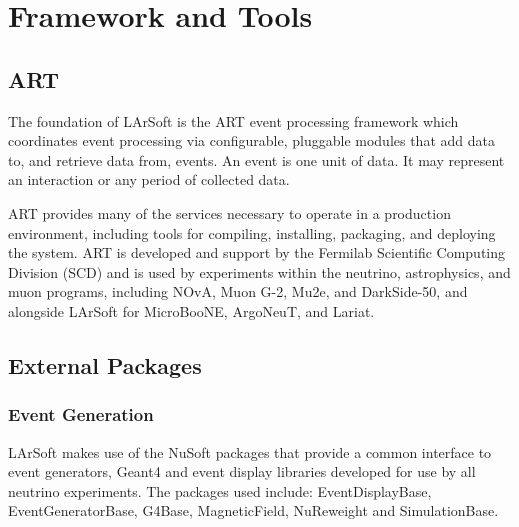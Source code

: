 \documentclass[12pt]{elsarticle}
\begin{document}
\hspace*{2cm}
\begin{figure}[h]
\centering
\label{bubble}
\end{figure}

\section{Framework and Tools}
\subsection{ART}
The foundation of LArSoft is the ART event processing framework which coordinates event processing via configurable, pluggable modules that add data to, and retrieve data from, events.\cite{art-ref}  An event is one unit of data. It may represent an interaction or any period of collected data.

ART provides many of the services necessary to operate in a production environment, including tools for compiling, installing, packaging, and deploying the system.  ART is developed and support by the Fermilab Scientific Computing Division (SCD) and is used by experiments within the neutrino, astrophysics, and muon programs, including NOvA, Muon G-2, Mu2e, and DarkSide-50, and alongside LArSoft for MicroBooNE, ArgoNeuT, and Lariat.

\subsection{External Packages}
\subsubsection{Event Generation}
LArSoft makes use of the NuSoft packages that provide a common interface to event generators, Geant4 and event display libraries developed for use by all neutrino experiments. The packages used include:    EventDisplayBase, EventGeneratorBase, G4Base, MagneticField, NuReweight and SimulationBase.
\end{document}
